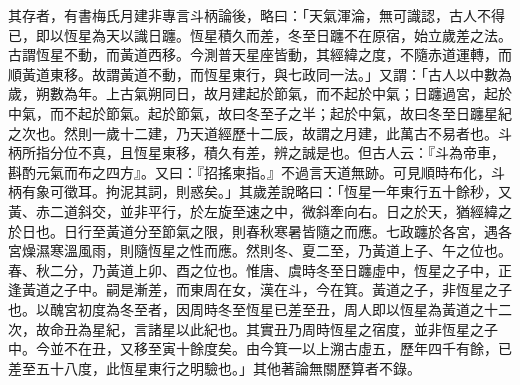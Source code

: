 \begin{pinyinscope}
其存者，有書梅氏月建非專言斗柄論後，略曰：「天氣渾淪，無可識認，古人不得已，即以恆星為天以識日躔。恆星積久而差，冬至日躔不在原宿，始立歲差之法。古謂恆星不動，而黃道西移。今測普天星座皆動，其經緯之度，不隨赤道運轉，而順黃道東移。故謂黃道不動，而恆星東行，與七政同一法。」又謂：「古人以中數為歲，朔數為年。上古氣朔同日，故月建起於節氣，而不起於中氣；日躔過宮，起於中氣，而不起於節氣。起於節氣，故曰冬至子之半；起於中氣，故曰冬至日躔星紀之次也。然則一歲十二建，乃天道經歷十二辰，故謂之月建，此萬古不易者也。斗柄所指分位不真，且恆星東移，積久有差，辨之誠是也。但古人云：『斗為帝車，斟酌元氣而布之四方』。又曰：『招搖柬指。』不過言天道無跡。可見順時布化，斗柄有象可徵耳。拘泥其詞，則惑矣。」其歲差說略曰：「恆星一年東行五十餘秒，又黃、赤二道斜交，並非平行，於左旋至速之中，微斜牽向右。日之於天，猶經緯之於日也。日行至黃道分至節氣之限，則春秋寒暑皆隨之而應。七政躔於各宮，遇各宮燥濕寒溫風雨，則隨恆星之性而應。然則冬、夏二至，乃黃道上子、午之位也。春、秋二分，乃黃道上卯、酉之位也。惟唐、虞時冬至日躔虛中，恆星之子中，正逢黃道之子中。嗣是漸差，而東周在女，漢在斗，今在箕。黃道之子，非恆星之子也。以醜宮初度為冬至者，因周時冬至恆星已差至丑，周人即以恆星為黃道之十二次，故命丑為星紀，言諸星以此紀也。其實丑乃周時恆星之宿度，並非恆星之子中。今並不在丑，又移至寅十餘度矣。由今箕一以上溯古虛五，歷年四千有餘，已差至五十八度，此恆星東行之明驗也。」其他著論無關歷算者不錄。


\end{pinyinscope}